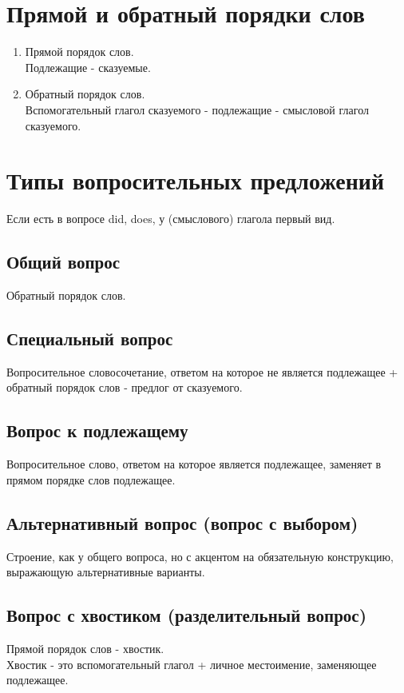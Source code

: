 \documentclass[oneside]{book}
\begin{document}
    \section{Прямой и обратный порядки слов}
    \begin{enumerate}
        \item Прямой порядок слов. \\
        Подлежащие - сказуемые.

        \item Обратный порядок слов. \\
        Вспомогательный глагол сказуемого - подлежащие - смысловой глагол сказуемого.
    \end{enumerate}

    \section{Типы вопросительных предложений}
    Если есть в вопросе did, does, у (смыслового) глагола первый вид.

    \subsection{Общий вопрос}
    Обратный порядок слов.

    \subsection{Специальный вопрос}
    Вопросительное словосочетание, ответом на которое не является подлежащее
    + обратный порядок слов - предлог от сказуемого.

    \subsection{Вопрос к подлежащему}
    Вопросительное слово, ответом на которое является подлежащее,
    заменяет в прямом порядке слов подлежащее.

    \subsection{Альтернативный вопрос (вопрос с выбором)}
    Строение, как у общего вопроса, но с акцентом на обязательную конструкцию,
    выражающую альтернативные варианты.

    \subsection{Вопрос с хвостиком (разделительный вопрос)}
    Прямой порядок слов - хвостик.
    \\
    Хвостик - это вспомогательный глагол + личное местоимение, заменяющее подлежащее.
\end{document}
